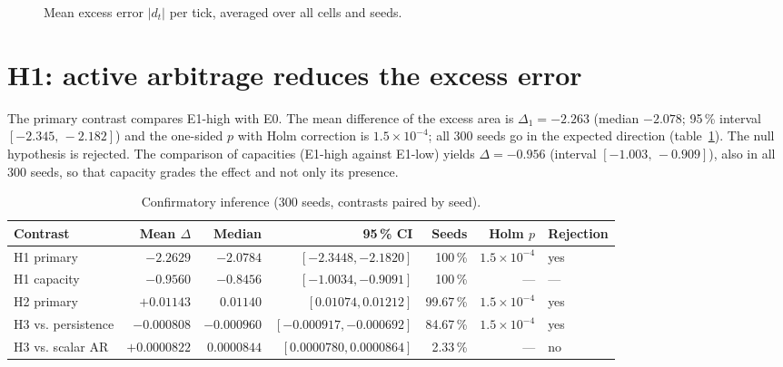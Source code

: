 \begin{figure}[htbp]
\centering
{}
\caption{Mean excess error $|d_t|$ per tick, averaged over all cells and seeds.}
\label{fig:trayectorias}
\end{figure}

\section{H1: active arbitrage reduces the excess error}
\label{sec:res-h1}

The primary contrast compares E1-high with E0. The mean difference of the excess area is $\Delta_1=-2.263$ (median $-2.078$; 95\,\% interval $[-2.345,\,-2.182]$) and the one-sided $p$ with Holm correction is $1.5\times10^{-4}$; all 300 seeds go in the expected direction (table~\ref{tab:inferencia}). The null hypothesis is rejected. The comparison of capacities (E1-high against E1-low) yields $\Delta=-0.956$ (interval $[-1.003,\,-0.909]$), also in all 300 seeds, so that capacity grades the effect and not only its presence.

\begin{table}[htbp]
\centering
\caption{Confirmatory inference (300 seeds, contrasts paired by seed).}
\label{tab:inferencia}
\small
\begin{tabular}{@{}lrrrrrl@{}}
\toprule
Contrast & Mean $\Delta$ & Median & 95\,\% CI & Seeds & Holm $p$ & Rejection \\
\midrule
H1 primary & $-2.2629$ & $-2.0784$ & $[-2.3448,-2.1820]$ & 100\,\% & $1.5\times10^{-4}$ & yes \\
H1 capacity & $-0.9560$ & $-0.8456$ & $[-1.0034,-0.9091]$ & 100\,\% & --- & --- \\
H2 primary & $+0.01143$ & $0.01140$ & $[0.01074,0.01212]$ & 99.67\,\% & $1.5\times10^{-4}$ & yes \\
H3 vs. persistence & $-0.000808$ & $-0.000960$ & $[-0.000917,-0.000692]$ & 84.67\,\% & $1.5\times10^{-4}$ & yes \\
H3 vs. scalar AR & $+0.0000822$ & $0.0000844$ & $[0.0000780,0.0000864]$ & 2.33\,\% & --- & no \\
\bottomrule
\end{tabular}
\end{table}

